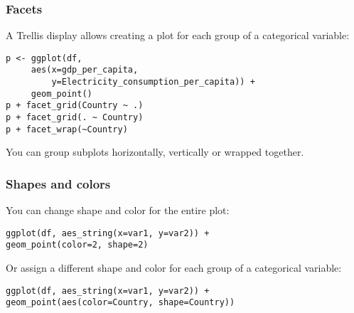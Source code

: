 \documentclass{beamer}
\begin{document}
	\begin{frame}[fragile]
		\frametitle{Facets}

		A Trellis display allows creating a plot for each group of a categorical variable:

		\vspace{2em}

		\begin{exampleblock}{}
		\begin{BVerbatim}
p <- ggplot(df,
     aes(x=gdp_per_capita,
         y=Electricity_consumption_per_capita)) +
     geom_point()
p + facet_grid(Country ~ .)
p + facet_grid(. ~ Country)
p + facet_wrap(~Country)
		\end{BVerbatim}
		\end{exampleblock}{}

		\vspace{2em}

		You can group subplots horizontally, vertically or wrapped together.

	\end{frame}

	\begin{frame}[fragile]
		\frametitle{Shapes and colors}

		You can change shape and color for the entire plot:

		\vspace{2em}

		\begin{exampleblock}{}
		\begin{BVerbatim}
ggplot(df, aes_string(x=var1, y=var2)) +
geom_point(color=2, shape=2)
		\end{BVerbatim}
		\end{exampleblock}{}

		\vspace{2em}

		Or assign a different shape and color for each group of a categorical variable:

		\vspace{2em}

		\begin{exampleblock}{}
		\begin{BVerbatim}
ggplot(df, aes_string(x=var1, y=var2)) +
geom_point(aes(color=Country, shape=Country))
		\end{BVerbatim}
		\end{exampleblock}{}

	\end{frame}
\end{document}
